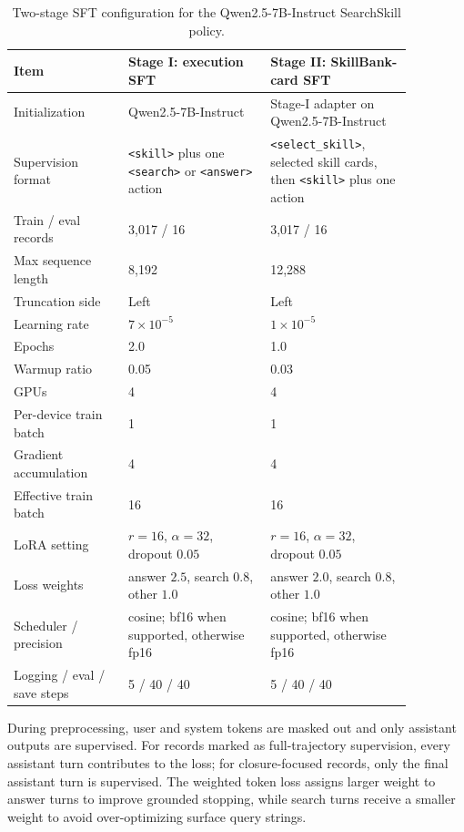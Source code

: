 \documentclass{article}
\newcommand{\tagopen}[2]{\texttt{\textcolor{#1}{<#2>}}}
\begin{document}
\begin{table}[tbp]
  \centering
  \caption{Two-stage SFT configuration for the Qwen2.5-7B-Instruct SearchSkill policy.}
  \label{tab:appendix-two-stage-sft-config}
  \setlength{\tabcolsep}{4pt}
  \renewcommand{\arraystretch}{1.12}
  \small
  \begin{tabular}{p{0.25\linewidth}p{0.31\linewidth}p{0.31\linewidth}}
    \toprule
    \textbf{Item} & \textbf{Stage I: execution SFT} & \textbf{Stage II: SkillBank-card SFT} \\
    \midrule
    Initialization & Qwen2.5-7B-Instruct & Stage-I adapter on Qwen2.5-7B-Instruct \\
    Supervision format & \tagopen{skilltagcolor}{skill} plus one \tagopen{searchtagcolor}{search} or \tagopen{answertagcolor}{answer} action & \tagopen{selecttagcolor}{select\_skill}, selected skill cards, then \tagopen{skilltagcolor}{skill} plus one action \\
    Train / eval records & 3,017 / 16 & 3,017 / 16 \\
    Max sequence length & 8,192 & 12,288 \\
    Truncation side & Left & Left \\
    Learning rate & \(7\times10^{-5}\) & \(1\times10^{-5}\) \\
    Epochs & 2.0 & 1.0 \\
    Warmup ratio & 0.05 & 0.03 \\
    GPUs & 4 & 4 \\
    Per-device train batch & 1 & 1 \\
    Gradient accumulation & 4 & 4 \\
    Effective train batch & 16 & 16 \\
    LoRA setting & \(r=16\), \(\alpha=32\), dropout \(0.05\) & \(r=16\), \(\alpha=32\), dropout \(0.05\) \\
    Loss weights & answer \(2.5\), search \(0.8\), other \(1.0\) & answer \(2.0\), search \(0.8\), other \(1.0\) \\
    Scheduler / precision & cosine; bf16 when supported, otherwise fp16 & cosine; bf16 when supported, otherwise fp16 \\
    Logging / eval / save steps & 5 / 40 / 40 & 5 / 40 / 40 \\
    \bottomrule
  \end{tabular}
\end{table}

During preprocessing, user and system tokens are masked out and only assistant outputs are supervised. For records marked as full-trajectory supervision, every assistant turn contributes to the loss; for closure-focused records, only the final assistant turn is supervised. The weighted token loss assigns larger weight to answer turns to improve grounded stopping, while search turns receive a smaller weight to avoid over-optimizing surface query strings.
\end{document}
